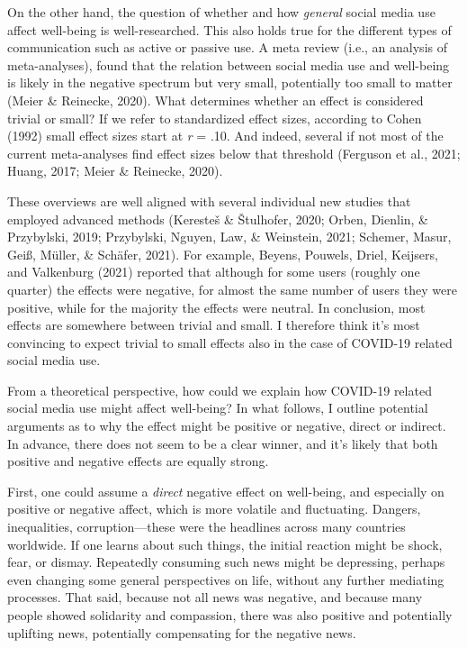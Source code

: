 \documentclass[
  english,
  man,mask,floatsintext]{apa6}
\begin{document}
On the other hand, the question of whether and how \emph{general} social media use affect well-being is well-researched.
This also holds true for the different types of communication such as active or passive use.
A meta review (i.e., an analysis of meta-analyses), found that the relation between social media use and well-being is likely in the negative spectrum but very small, potentially too small to matter (Meier \& Reinecke, 2020).
What determines whether an effect is considered trivial or small?
If we refer to standardized effect sizes, according to Cohen (1992) small effect sizes start at \emph{r} = .10.
And indeed, several if not most of the current meta-analyses find effect sizes below that threshold (Ferguson et al., 2021; Huang, 2017; Meier \& Reinecke, 2020).

These overviews are well aligned with several individual new studies that employed advanced methods (Keresteš \& Štulhofer, 2020; Orben, Dienlin, \& Przybylski, 2019; Przybylski, Nguyen, Law, \& Weinstein, 2021; Schemer, Masur, Geiß, Müller, \& Schäfer, 2021).
For example, Beyens, Pouwels, Driel, Keijsers, and Valkenburg (2021) reported that although for some users (roughly one quarter) the effects were negative, for almost the same number of users they were positive, while for the majority the effects were neutral.
In conclusion, most effects are somewhere between trivial and small.
I therefore think it's most convincing to expect trivial to small effects also in the case of COVID-19 related social media use.

From a theoretical perspective, how could we explain how COVID-19 related social media use might affect well-being?
In what follows, I outline potential arguments as to why the effect might be positive or negative, direct or indirect.
In advance, there does not seem to be a clear winner, and it's likely that both positive and negative effects are equally strong.

First, one could assume a \emph{direct} negative effect on well-being, and especially on positive or negative affect, which is more volatile and fluctuating.
Dangers, inequalities, corruption---these were the headlines across many countries worldwide.
If one learns about such things, the initial reaction might be shock, fear, or dismay.
Repeatedly consuming such news might be depressing, perhaps even changing some general perspectives on life, without any further mediating processes.
That said, because not all news was negative, and because many people showed solidarity and compassion, there was also positive and potentially uplifting news, potentially compensating for the negative news.
\end{document}
